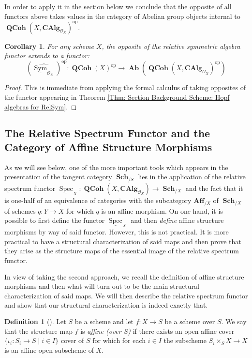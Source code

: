 \documentclass{amsart}
\newtheorem{corollary}[equation]{Corollary}
\theoremstyle{definition}
\newtheorem{definition}[equation]{Definition}
\DeclareMathOperator{\Ocal}{\mathcal{O}}
\DeclareMathOperator{\sym}{Sym}
\DeclareMathOperator{\Ab}{\mathbf{Ab}}
\DeclareMathOperator{\op}{op}
\DeclareMathOperator{\Spec}{Spec}
\newcommand{\CAlg}[1]{\mathbf{CAlg}_{#1}}
\newcommand{\RelSpec}[1]{\underline{\Spec}_{#1}}
\newcommand{\RelSym}[1]{\underline{\sym}_{{#1}}}
\DeclareMathOperator{\Sch}{\mathbf{Sch}}
\DeclareMathOperator{\QCoh}{\mathbf{QCoh}}
\numberwithin{equation}{subsection}
\begin{document}
In order to apply it in the section below we conclude that the opposite of all functors above takes values in the category of Abelian group objects internal to $\QCoh(X,\CAlg{\Ocal_X})^{\op}$.
\begin{corollary}\label{Cor: Section Background Scheme: Hopf algebra result in opposite land}
For any scheme $X$, the opposite of the relative symmetric algebra functor extends to a functor:
\[
\left(\widehat{\RelSym{\Ocal_X}}\right)^{\op}:\QCoh(X)^{\op} \to \Ab\left(\QCoh(X,\CAlg{\Ocal_X})^{\op}\right)
\]
\end{corollary}
\begin{proof}
This is immediate from applying the formal calculus of taking opposites of the functor appearing in Theorem \ref{Thm: Section Background Scheme: Hopf algebras for RelSym}.
\end{proof}

\subsection{The Relative Spectrum Functor and the Category of Affine Structure Morphisms}\label{Subsection: Relative Spectrum}

As we will see below, one of the more important tools which appears in the presentation of the tangent category $\Sch_{/S}$ lies in the application of the relative spectrum functor $\RelSpec{X}:\QCoh(X,\CAlg{\Ocal_X}) \to \Sch_{/X}$ and the fact that it is one-half of an equivalence of categories with the subcategory $\mathbf{Aff}_{/X}$ of $\Sch_{/X}$ of schemes $q:Y \to X$ for which $q$ is an affine morphism. On one hand, it is possible to first define the functor $\RelSpec{X}$ and then \emph{define} affine structure morphisms by way of said functor. However, this is not practical. It is more practical to have a structural characterization of said maps and then prove that they arise as the structure maps of the essential image of the relative spectrum functor.

In view of taking the second approach, we recall the definition of affine structure morphisms and then what will turn out to be the main structural characterization of said maps. We will then describe the relative spectrum functor and show that our structural characterization is indeed exactly that.
\begin{definition}[{\cite[D{\'e}finition 1.2.1]{EGA2}}]\label{Defn: Scheme Background: Affine Morphism}
Let $S$ be a scheme and let $f:X \to S$ be a scheme over $S$. We say that the structure map $f$ is \emph{affine (over $S$)} if there exists an open affine cover $\lbrace \iota_i:S_i \to S \; | \; i \in I \rbrace$ cover of $S$ for which for each $i \in I$ the subscheme $S_i \times_S X \to X$ is an affine open subscheme of $X$.
\end{definition}
\end{document}
